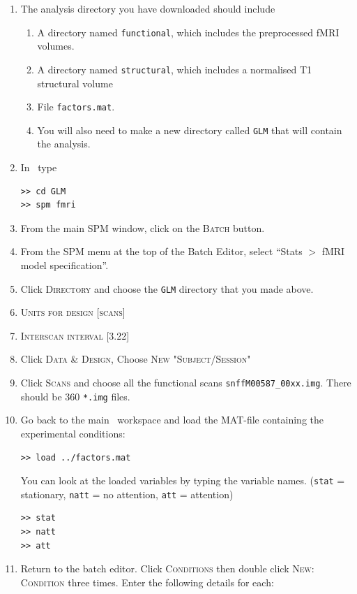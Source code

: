 \begin{enumerate}
 \item The analysis directory you have downloaded should include
 \begin{enumerate}
  \item A directory named \texttt{functional}, which includes the preprocessed fMRI volumes.
  \item A directory named \texttt{structural}, which includes a normalised T1 structural volume
  \item File \texttt{factors.mat}.
  \item You will also need to make a new directory called \texttt{GLM} that will contain the analysis.
 \end{enumerate}
 \item In \matlab\ type
\begin{verbatim}
>> cd GLM
>> spm fmri
\end{verbatim}
 \item From the main SPM window, click on the \textsc{Batch} button.
 \item From the SPM menu at the top of the Batch Editor, select ``Stats $>$ fMRI model specification''.
 \item Click \textsc{Directory} and choose the \texttt{GLM} directory that you made above.
 \item \textsc{Units for design} [\textsc{scans}]
 \item \textsc{Interscan interval} [3.22]
 \item Click \textsc{Data \& Design}, Choose \textsc{New "Subject/Session"}
 \item Click \textsc{Scans} and choose all the functional scans \texttt{snffM00587\_00xx.img}. There should be 360 \texttt{*.img} files.
 \item Go back to the main \matlab\ workspace and load the MAT-file containing the experimental conditions:
\begin{verbatim}
>> load ../factors.mat
\end{verbatim}
You can look at the loaded variables by typing the variable names.
(\texttt{stat} = stationary, \texttt{natt} = no attention, \texttt{att} = attention)
\begin{verbatim}
>> stat
>> natt
>> att
\end{verbatim}
 \item Return to the batch editor. Click \textsc{Conditions} then double click \textsc{New: Condition} three times. Enter the following details for each:
 \begin{itemize}

\end{itemize}
\end{enumerate}
